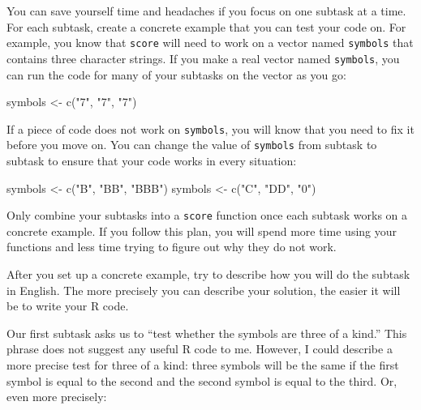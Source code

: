 \documentclass[
  letterpaper,
  DIV=11,
  numbers=noendperiod]{scrbook}
\newenvironment{Shaded}{\begin{snugshade}}{\end{snugshade}}
\newcommand{\FunctionTok}[1]{\textcolor[rgb]{0.28,0.35,0.67}{#1}}
\newcommand{\NormalTok}[1]{\textcolor[rgb]{0.00,0.23,0.31}{#1}}
\newcommand{\OtherTok}[1]{\textcolor[rgb]{0.00,0.23,0.31}{#1}}
\newcommand{\StringTok}[1]{\textcolor[rgb]{0.13,0.47,0.30}{#1}}
\begin{document}
You can save yourself time and headaches if you focus on one subtask at
a time. For each subtask, create a concrete example that you can test
your code on. For example, you know that \texttt{score} will need to
work on a vector named \texttt{symbols} that contains three character
strings. If you make a real vector named \texttt{symbols}, you can run
the code for many of your subtasks on the vector as you go:

\begin{Shaded}
\begin{Highlighting}[]
\NormalTok{symbols }\OtherTok{\textless{}{-}} \FunctionTok{c}\NormalTok{(}\StringTok{"7"}\NormalTok{, }\StringTok{"7"}\NormalTok{, }\StringTok{"7"}\NormalTok{)}
\end{Highlighting}
\end{Shaded}

If a piece of code does not work on \texttt{symbols}, you will know that
you need to fix it before you move on. You can change the value of
\texttt{symbols} from subtask to subtask to ensure that your code works
in every situation:

\begin{Shaded}
\begin{Highlighting}[]
\NormalTok{symbols }\OtherTok{\textless{}{-}} \FunctionTok{c}\NormalTok{(}\StringTok{"B"}\NormalTok{, }\StringTok{"BB"}\NormalTok{, }\StringTok{"BBB"}\NormalTok{)}
\NormalTok{symbols }\OtherTok{\textless{}{-}} \FunctionTok{c}\NormalTok{(}\StringTok{"C"}\NormalTok{, }\StringTok{"DD"}\NormalTok{, }\StringTok{"0"}\NormalTok{)}
\end{Highlighting}
\end{Shaded}

Only combine your subtasks into a \texttt{score} function once each
subtask works on a concrete example. If you follow this plan, you will
spend more time using your functions and less time trying to figure out
why they do not work.

After you set up a concrete example, try to describe how you will do the
subtask in English. The more precisely you can describe your solution,
the easier it will be to write your R code.

Our first subtask asks us to ``test whether the symbols are three of a
kind.'' This phrase does not suggest any useful R code to me. However, I
could describe a more precise test for three of a kind: three symbols
will be the same if the first symbol is equal to the second and the
second symbol is equal to the third. Or, even more precisely:
\end{document}

